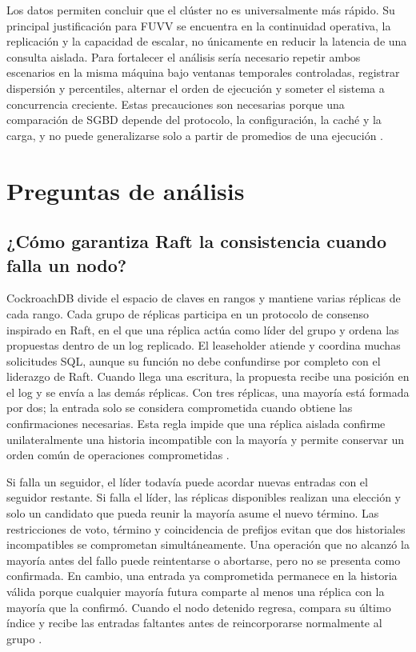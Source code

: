 \documentclass[12pt,a4paper]{article}
\begin{document}
Los datos permiten concluir que el clúster no es universalmente más rápido. Su principal justificación para FUVV se encuentra en la continuidad operativa, la replicación y la capacidad de escalar, no únicamente en reducir la latencia de una consulta aislada. Para fortalecer el análisis sería necesario repetir ambos escenarios en la misma máquina bajo ventanas temporales controladas, registrar dispersión y percentiles, alternar el orden de ejecución y someter el sistema a concurrencia creciente. Estas precauciones son necesarias porque una comparación de SGBD depende del protocolo, la configuración, la caché y la carga, y no puede generalizarse solo a partir de promedios de una ejecución \cite{taipalus2024performance,schafer2020benchmarking}.

\section{Preguntas de análisis}

\subsection{¿Cómo garantiza Raft la consistencia cuando falla un nodo?}

CockroachDB divide el espacio de claves en rangos y mantiene varias réplicas de cada rango. Cada grupo de réplicas participa en un protocolo de consenso inspirado en Raft, en el que una réplica actúa como líder del grupo y ordena las propuestas dentro de un log replicado. El leaseholder atiende y coordina muchas solicitudes SQL, aunque su función no debe confundirse por completo con el liderazgo de Raft. Cuando llega una escritura, la propuesta recibe una posición en el log y se envía a las demás réplicas. Con tres réplicas, una mayoría está formada por dos; la entrada solo se considera comprometida cuando obtiene las confirmaciones necesarias. Esta regla impide que una réplica aislada confirme unilateralmente una historia incompatible con la mayoría y permite conservar un orden común de operaciones comprometidas \cite{taft2020cockroachdb,lewchenko2025strongconsistency}.

Si falla un seguidor, el líder todavía puede acordar nuevas entradas con el seguidor restante. Si falla el líder, las réplicas disponibles realizan una elección y solo un candidato que pueda reunir la mayoría asume el nuevo término. Las restricciones de voto, término y coincidencia de prefijos evitan que dos historiales incompatibles se comprometan simultáneamente. Una operación que no alcanzó la mayoría antes del fallo puede reintentarse o abortarse, pero no se presenta como confirmada. En cambio, una entrada ya comprometida permanece en la historia válida porque cualquier mayoría futura comparte al menos una réplica con la mayoría que la confirmó. Cuando el nodo detenido regresa, compara su último índice y recibe las entradas faltantes antes de reincorporarse normalmente al grupo \cite{taft2020cockroachdb,gupta2020agreement}.
\end{document}
